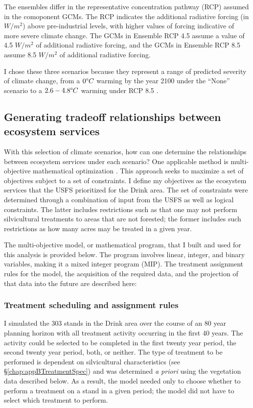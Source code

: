The ensembles differ in the representative concentration pathway (RCP) assumed in the comoponent GCMs. The RCP indicates the additional radiative forcing (in $W/m^2$) above pre-industrial levels, with higher values of forcing indicative of more severe climate change. The GCMs in Ensemble RCP 4.5 assume a value of 4.5 $W/m^2$ of additional radiative forcing, and the GCMs in Ensemble RCP 8.5 assume 8.5 $W/m^2$ of additional radiative forcing.

I chose these three scenarios because they represent a range of predicted severity of climate change, from a $0 \degree C$ warming by the year 2100 under the ``None'' scenario to a $2.6-4.8 \degree C$ warming under RCP 8.5 \cite{ipcc2013climate}.

\subsection{Generating tradeoff relationships between ecosystem services}
\label{subsec:whyUsingMultiObjModel}
With this selection of climate scenarios, how can one determine the relationships between ecosystem services under each scenario? One applicable method is multi-objective mathematical optimization \cite{TothFsci2009}. This approach seeks to maximize a set of objectives subject to a set of constraints. I define my objectives as the ecosystem services that the USFS prioritized for the Drink area. The set of constraints were determined through a combination of input from the USFS as well as logical constraints. The latter includes restrictions such as that one may not perform silvicultural treatments to areas that are not forested; the former includes such restrictions as how many acres may be treated in a given year.

The multi-objective model, or mathematical program, that I built and used for this analysis is provided below. The program involves linear, integer, and binary variables, making it a mixed integer program (MIP). The treatment assignment rules for the model, the acquisition of the required data, and the projection of that data into the future are described here:

\subsubsection{Treatment scheduling and assignment rules}
I simulated the 303 stands in the Drink area over the course of an 80 year planning horizon with all treatment activity occurring in the first 40 years. The activity could be selected to be completed in the first twenty year period, the second twenty year period, both, or neither. The type of treatment to be performed is dependent on silvicultural characteristics (see \S \ref{chap:appBTreatmentSpec}) and was determined \textit{a priori} using the vegetation data described below. As a result, the model needed only to choose whether to perform a treatment on a stand in a given period; the model did not have to select which treatment to perform.

